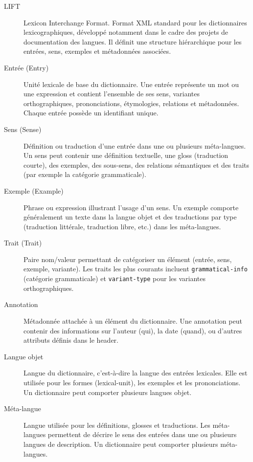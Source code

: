 \documentclass[11pt,twoside,openany]{book}
\begin{document}
\begin{description}
\item[LIFT] Lexicon Interchange Format. Format XML standard pour les dictionnaires lexicographiques, développé notamment dans le cadre des projets de documentation des langues. Il définit une structure hiérarchique pour les entrées, sens, exemples et métadonnées associées.

\item[Entrée (Entry)] Unité lexicale de base du dictionnaire. Une entrée représente un mot ou une expression et contient l'ensemble de ses sens, variantes orthographiques, prononciations, étymologies, relations et métadonnées. Chaque entrée possède un identifiant unique.

\item[Sens (Sense)] Définition ou traduction d'une entrée dans une ou plusieurs méta-langues. Un sens peut contenir une définition textuelle, une gloss (traduction courte), des exemples, des sous-sens, des relations sémantiques et des traits (par exemple la catégorie grammaticale).

\item[Exemple (Example)] Phrase ou expression illustrant l'usage d'un sens. Un exemple comporte généralement un texte dans la langue objet et des traductions par type (traduction littérale, traduction libre, etc.) dans les méta-langues.

\item[Trait (Trait)] Paire nom/valeur permettant de catégoriser un élément (entrée, sens, exemple, variante). Les traits les plus courants incluent \texttt{grammatical-info} (catégorie grammaticale) et \texttt{variant-type} pour les variantes orthographiques.

\item[Annotation] Métadonnée attachée à un élément du dictionnaire. Une annotation peut contenir des informations sur l'auteur (qui), la date (quand), ou d'autres attributs définis dans le header.

\item[Langue objet] Langue du dictionnaire, c'est-à-dire la langue des entrées lexicales. Elle est utilisée pour les formes (lexical-unit), les exemples et les prononciations. Un dictionnaire peut comporter plusieurs langues objet.

\item[Méta-langue] Langue utilisée pour les définitions, glosses et traductions. Les méta-langues permettent de décrire le sens des entrées dans une ou plusieurs langues de description. Un dictionnaire peut comporter plusieurs méta-langues.


\end{description}
\end{document}
